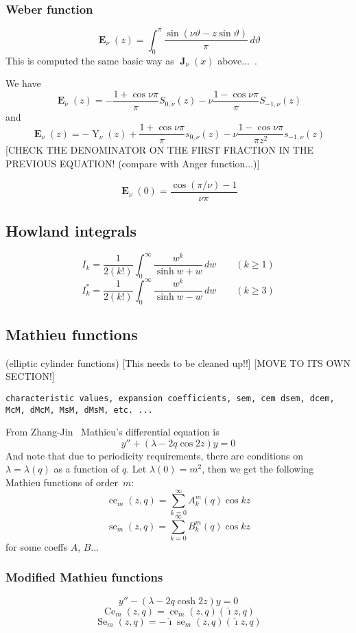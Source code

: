 \documentclass[10pt,dvipdfmx,letterpaper,twoside]{article}
\let\O=\operatorname
\newcommand{\Ob}[1]{\operatorname{\mathbf{#1}}}
\newcommand{\ii}{{\hat{\imath}}}
\let\lam=\lambda
\let\theta=\vartheta
\begin{document}
\subsubsection{Weber function}
\[ \Ob{E}_\nu(z) = \int_0^\pi\frac{\sin(\nu\theta - z\sin\theta)}{\pi}\,d\theta \]
This is computed the same basic way as $\Ob{J}_\nu(x)$ above...~\cite{atlas:thompson}.

We have
\[ \Ob{E}_\nu(z) = -\frac{1+\cos\nu\pi}{\pi}S_{0,\nu}(z) - \nu\frac{1-\cos\nu\pi}{\pi}S_{-1,\nu}(z) \]
and
\[ \Ob{E}_\nu(z) = -\O{Y}_\nu(z) + \frac{1+\cos\nu\pi}{\pi}s_{0,\nu}(z) - \nu\frac{1-\cos\nu\pi}{\pi z^2}s_{-1,\nu}(z) \]
[CHECK THE DENOMINATOR ON THE FIRST FRACTION IN THE PREVIOUS EQUATION! (compare with Anger function...)]

\[ \Ob{E}_\nu(0) = \frac{\cos(\pi/\nu) - 1}{\nu\pi} \]

\subsection{Howland integrals}
\[ I_k = \frac{1}{2(k!)}\int_0^\infty \frac{w^k}{\O{sinh}w + w}\,dw \qquad (k\geq1) \]
\[ I^*_k = \frac{1}{2(k!)}\int_0^\infty \frac{w^k}{\O{sinh}w - w}\,dw \qquad (k\geq3) \]

\subsection{Mathieu functions}
(elliptic cylinder functions)
[This needs to be cleaned up!!]
[MOVE TO ITS OWN SECTION!]

{\tt characteristic values, expansion coefficients, sem, cem dsem, dcem, McM, dMcM, MsM, dMsM, etc. ...}

From Zhang-Jin~\cite{zj}
Mathieu's differential equation is
\[  y'' + (\lam - 2q\cos 2z)y = 0 \]
And note that due to periodicity requirements, there are conditions on $\lam=\lam(q)$ as a function of $q$.
Let $\lam(0) = m^2$, then we get the following Mathieu functions of order~$m$:
\[ \O{ce}_m(z,q) = \sum_{k=0}^\infty A^m_k(q)\cos kz \]
\[ \O{se}_m(z,q) = \sum_{k=0}^\infty B^m_k(q)\cos kz \]
for some coeffs $A$, $B$...

\subsubsection{Modified Mathieu functions}

\[  y'' - (\lam - 2q\cosh 2z)y = 0 \]
\[ \O{Ce}_m(z,q) = \O{ce}_m(z,q)(\ii z,q) \]
\[ \O{Se}_m(z,q) = -\ii \O{se}_m(z,q)(\ii z,q) \]
\end{document}
